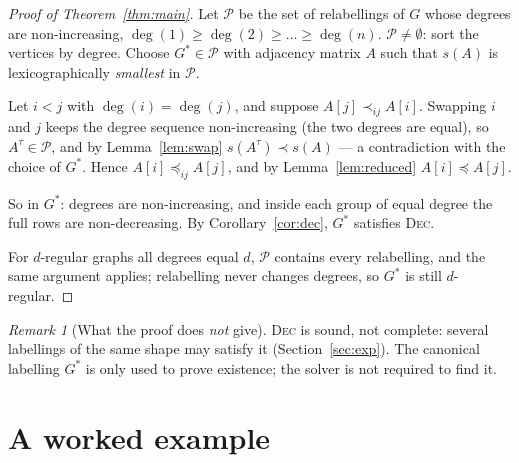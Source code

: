 \documentclass[11pt,a4paper]{article}
\theoremstyle{definition}
\theoremstyle{remark}
\newtheorem{remark}[theorem]{Remark}
\newcommand{\lex}{\preceq}
\newcommand{\slex}{\prec}
\newcommand{\red}[2]{\mathrel{\preceq_{#1#2}}}
\newcommand{\sred}[2]{\mathrel{\prec_{#1#2}}}
\begin{document}
\begin{proof}[Proof of Theorem~\ref{thm:main}]
Let $\mathcal{P}$ be the set of relabellings of $G$ whose degrees are non-increasing,
$\deg(1)\ge\deg(2)\ge\dots\ge\deg(n)$. $\mathcal{P}\neq\emptyset$: sort the vertices by
degree. Choose $G^\ast\in\mathcal{P}$ with adjacency matrix $A$ such that $s(A)$ is
lexicographically \emph{smallest} in $\mathcal{P}$.

Let $i<j$ with $\deg(i)=\deg(j)$, and suppose $A[j]\sred ij A[i]$. Swapping $i$ and $j$
keeps the degree sequence non-increasing (the two degrees are equal), so
$A^\tau\in\mathcal{P}$, and by Lemma~\ref{lem:swap} $s(A^\tau)\slex s(A)$ --- a contradiction
with the choice of $G^\ast$. Hence $A[i]\red ij A[j]$, and by Lemma~\ref{lem:reduced}
$A[i]\lex A[j]$.

So in $G^\ast$: degrees are non-increasing, and inside each group of equal degree the full
rows are non-decreasing. By Corollary~\ref{cor:dec}, $G^\ast$ satisfies \textsc{Dec}.

For $d$-regular graphs all degrees equal $d$, $\mathcal{P}$ contains every relabelling,
and the same argument applies; relabelling never changes degrees, so $G^\ast$ is still
$d$-regular.
\end{proof}

\begin{remark}[What the proof does \emph{not} give]
\textsc{Dec} is sound, not complete: several labellings of the same shape may satisfy it
(Section~\ref{sec:exp}). The canonical labelling $G^\ast$ is only used to prove existence;
the solver is not required to find it.
\end{remark}

\section{A worked example}
\end{document}
